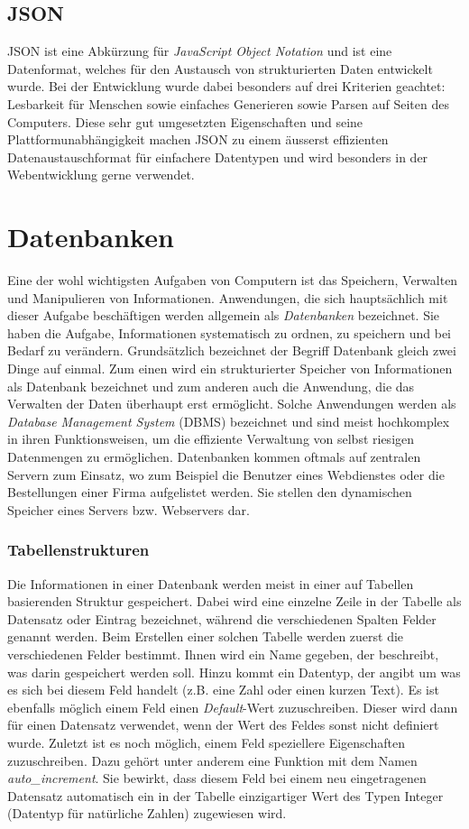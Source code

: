 \documentclass[../main.tex]{subfiles}
\begin{document}
	\subsection{JSON}
	JSON ist eine Abkürzung für \emph{JavaScript Object Notation} und ist eine Datenformat, welches für den Austausch von strukturierten Daten entwickelt wurde. Bei der Entwicklung wurde dabei besonders auf drei Kriterien geachtet: Lesbarkeit für Menschen sowie einfaches Generieren sowie Parsen auf Seiten des Computers. Diese sehr gut umgesetzten Eigenschaften und seine Plattformunabhängigkeit  machen JSON zu einem äusserst effizienten Datenaustauschformat für einfachere Datentypen und wird besonders in der Webentwicklung gerne verwendet. \cite{JSON}
	
	\section{Datenbanken} \label{Datenbanken}
	Eine der wohl wichtigsten Aufgaben von Computern ist das Speichern, Verwalten und Manipulieren von Informationen. Anwendungen, die sich hauptsächlich mit dieser Aufgabe beschäftigen werden allgemein als \emph{Datenbanken} bezeichnet. Sie haben die Aufgabe, Informationen systematisch zu ordnen, zu speichern und bei Bedarf zu verändern. Grundsätzlich bezeichnet der Begriff Datenbank gleich zwei Dinge auf einmal. Zum einen wird ein strukturierter Speicher von Informationen als Datenbank bezeichnet und zum anderen auch die Anwendung, die das Verwalten der Daten überhaupt erst ermöglicht. Solche Anwendungen werden als \emph{Database Management System} (DBMS) bezeichnet und sind meist hochkomplex in ihren Funktionsweisen, um die effiziente Verwaltung von selbst riesigen Datenmengen zu ermöglichen. \cite{IT-Handbuch} Datenbanken kommen oftmals auf zentralen Servern zum Einsatz, wo zum Beispiel die Benutzer eines Webdienstes oder die Bestellungen einer Firma aufgelistet werden. Sie stellen den dynamischen Speicher eines Servers bzw. Webservers dar.
	
	\subsubsection*{Tabellenstrukturen}
	Die Informationen in einer Datenbank werden meist in einer auf Tabellen basierenden Struktur gespeichert. Dabei wird eine einzelne Zeile in der Tabelle als Datensatz oder Eintrag bezeichnet, während die verschiedenen Spalten Felder genannt werden. Beim Erstellen einer solchen Tabelle werden zuerst die verschiedenen Felder bestimmt. Ihnen wird ein Name gegeben, der beschreibt, was darin gespeichert werden soll. Hinzu kommt ein Datentyp, der angibt um was es sich bei diesem Feld handelt (z.B. eine Zahl oder einen kurzen Text). Es ist ebenfalls möglich einem Feld einen \emph{Default}-Wert zuzuschreiben. Dieser wird dann für einen Datensatz verwendet, wenn der Wert des Feldes sonst nicht definiert wurde. Zuletzt ist es noch möglich, einem Feld speziellere Eigenschaften zuzuschreiben. Dazu gehört unter anderem eine Funktion mit dem Namen \emph{auto\_increment}. Sie bewirkt, dass diesem Feld bei einem neu eingetragenen Datensatz automatisch ein in der Tabelle einzigartiger Wert des Typen Integer (Datentyp für natürliche Zahlen) zugewiesen wird.
	
\end{document}
